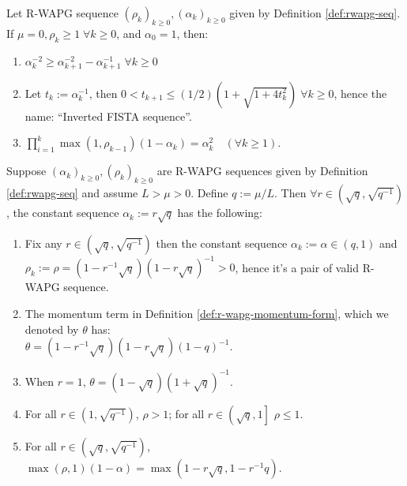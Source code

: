 \documentclass[12pt]{article}
\begin{document}
        
        \begin{lemma}\label{lemma:inverted-fista-seq}
            Let R-WAPG sequence $(\rho_k)_{k \ge 0}, (\alpha_k)_{k \ge 0}$ given by Definition \ref{def:rwapg-seq}. 
            If $\mu = 0, \rho_k \ge 1\; \forall k \ge 0$, and $\alpha_0 = 1$, then: 
            \begin{enumerate}
                \item $\alpha_k^{-2} \ge \alpha_{k + 1}^{-2} - \alpha_{k + 1}^{-1}\; \forall k \ge 0$
                \item Let $t_k := \alpha_k^{-1}$, then $0 < t_{k + 1} \le (1/2)\left(1 + \sqrt{1 + 4t_k^2}\right)\;\forall k\ge 0$, hence the name: ``Inverted FISTA sequence''. 
                \item $\prod_{i = 1}^k\max(1, \rho_{k - 1})(1 - \alpha_k) = \alpha_k^2 \quad (\forall k \ge 1)$. 
            \end{enumerate}
        \end{lemma}
        \begin{lemma}\label{lemma:constant-rwapg-seq}
            Suppose $(\alpha_k)_{k \ge 0}, (\rho_k)_{k \ge 0}$ are R-WAPG sequences given by Definition \ref{def:rwapg-seq} and assume $L > \mu > 0$.
            Define $q := \mu/L$. 
            Then $\forall r \in \left(\sqrt{q},\sqrt{q^{-1}}\right)$, the constant sequence $\alpha_k := r \sqrt{q}$ has the following: 
            \begin{enumerate}
                \item Fix any $r \in \left(\sqrt{q}, \sqrt{q^{-1}}\right)$ then the constant sequence $\alpha_k := \alpha \in (q, 1)$ and\\
                $\rho_k := \rho=\left(1-r^{-1}\sqrt{q}\right)\left(1 - r \sqrt{q}\right)^{-1} > 0$, hence it's a pair of valid R-WAPG sequence. 
                \item The momentum term in Definition \ref{def:r-wapg-momentum-form}, which we denoted by $\theta$ has:\\ $\theta = (1 - r^{-1}\sqrt{q})(1 - r\sqrt{q})(1- q)^{-1}$. 
                \item When $r = 1$, $\theta = (1- \sqrt{q})(1 + \sqrt{q})^{-1}$. 
                \item For all $r \in \left(1, \sqrt{q^{-1}}\right)$, $\rho > 1$; for all $r \in \left(\sqrt{q}, 1\right]$ $\rho \le 1$. 
                \item For all $r \in \left(\sqrt{q}, \sqrt{q^{-1}}\right)$, $\max(\rho, 1)(1 - \alpha) = \max\left(1 - r\sqrt{q}, 1 - r^{-1}q\right)$. 
            \end{enumerate}
        \end{lemma}
\end{document}
